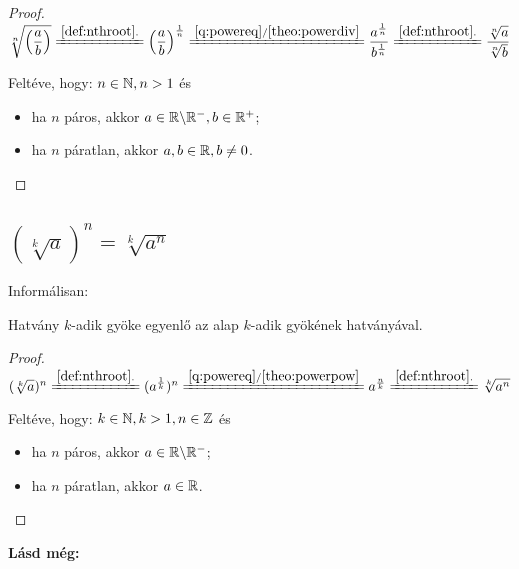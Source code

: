 \begin{proof}

$ \sqrt[n]{\Big(\dfrac{a}{b}\Big)} 
 \xlongequal{\ref{def:nthroot}.}
  \Big(\dfrac{a}{b}\Big)^{\frac{1}{n}}
 \xlongequal{\ref{q:powereq}/\ref{theo:powerdiv}}
  \dfrac{a^{\frac{1}{n}}}{b^{\frac{1}{n}}}
 \xlongequal{\ref{def:nthroot}.}
  \dfrac{\sqrt[n]{a}}{\sqrt[n]{b}}
$

Feltéve, hogy: $n \in \mathbb{N}, n >1$ és
\begin{itemize}
  \item ha $n$ páros, akkor $a \in \mathbb{R} \backslash \mathbb{R}^-, b \in \mathbb{R}^+$;
  \item ha $n$ páratlan, akkor $a, b \in \mathbb{R}, b \neq 0$.
\end{itemize}
\end{proof}
	
\subsection{
\texorpdfstring
  {$(\sqrt[k]{a})^n = \sqrt[k]{a^n}$}
  {(a**(1/k))**n = (a**n)**(1/k)}
}
Informálisan:

Hatvány $k$-adik gyöke egyenlő az alap $k$-adik gyökének hatványával.

\begin{proof}

$ (\sqrt[k]{a})^n 
 \xlongequal{\ref{def:nthroot}.}
  (a^{\frac{1}{k}})^n
 \xlongequal{\ref{q:powereq}/\ref{theo:powerpow}}
  a^{\frac{n}{k}}
 \xlongequal{\ref{def:nthroot}.}
  \sqrt[k]{a^n}
$

Feltéve, hogy: $k \in \mathbb{N}, k >1, n \in \mathbb{Z}$ és
\begin{itemize}
  \item ha $n$ páros, akkor $a \in \mathbb{R} \backslash \mathbb{R}^-$;
  \item ha $n$ páratlan, akkor $a \in \mathbb{R}$.
\end{itemize}
\end{proof}
	
\textbf{Lásd még:} 

